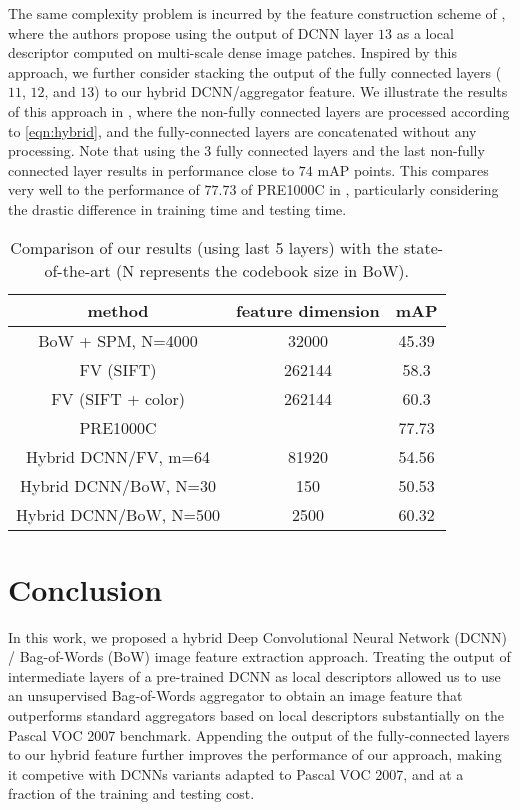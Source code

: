 \documentclass{article}
\begin{document}
The same complexity problem is incurred by the feature construction scheme of \cite{gong2014multi}, where the authors propose using the output of DCNN layer $13$ as a local descriptor computed on multi-scale dense image patches. Inspired by this approach, we further consider stacking the output of the fully connected layers ($11$, $12$, and $13$) to our hybrid DCNN/aggregator feature. We illustrate the results of this approach in , where the non-fully connected layers are processed according to \eqref{eqn:hybrid}, and the fully-connected layers are concatenated without any processing. Note that using the $3$ fully connected layers and the last non-fully connected layer results in performance close to $74$ mAP points. This compares very well to the performance of $77.73$ of PRE1000C in , particularly considering the drastic difference in training time and testing time.


\begin{table}[!ht]
\centering
\begin{tabular}{c|c|c}
\hline
method& feature dimension & mAP\\
\hline
BoW + SPM, N=4000 \cite{Chatfield2011} & 32000 & 45.39\\
FV (SIFT) \cite{perronnin}& 262144 & 58.3\\
FV (SIFT + color) \cite{perronnin} & 262144 & 60.3\\
PRE1000C \cite{Oquaba} &&77.73\\
\hline
Hybrid DCNN/FV, m=64 &81920&54.56\\
Hybrid DCNN/BoW, N=30 & 150&50.53\\
Hybrid DCNN/BoW, N=500 & 2500&60.32\\

\hline
\end{tabular}
\caption{Comparison of our results (using last 5 layers) with the state-of-the-art (N represents the codebook size in BoW).}
\label{compare}
\end{table}
\section{Conclusion}\label{conclusion}
In this work, we proposed a hybrid Deep Convolutional Neural Network (DCNN) / Bag-of-Words (BoW) image feature extraction approach. Treating the output of intermediate layers of a pre-trained DCNN as local descriptors allowed us to use an unsupervised  Bag-of-Words aggregator to obtain an image feature that outperforms standard aggregators based on local descriptors substantially on the Pascal VOC 2007 benchmark. Appending the output of the fully-connected layers to our hybrid feature further improves the performance of our approach, making it competive with DCNNs variants adapted to Pascal VOC 2007, and at a fraction of the training and testing cost.







\end{document}

